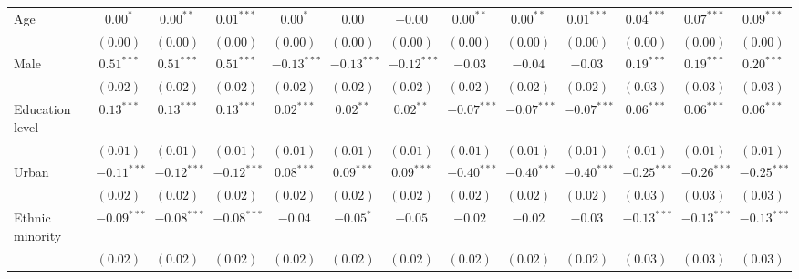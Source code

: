 \begin{table}
\begin{center}
\begin{threeparttable}
\begin{tabular}{l c c c c c c c c c c c c}
Age                             & $0.00^{*}$    & $0.00^{**}$   & $0.01^{***}$  & $0.00^{*}$    & $0.00$        & $-0.00$       & $0.00^{**}$   & $0.00^{**}$   & $0.01^{***}$  & $0.04^{***}$  & $0.07^{***}$  & $0.09^{***}$  \\
                                & $(0.00)$      & $(0.00)$      & $(0.00)$      & $(0.00)$      & $(0.00)$      & $(0.00)$      & $(0.00)$      & $(0.00)$      & $(0.00)$      & $(0.00)$      & $(0.00)$      & $(0.00)$      \\
Male                            & $0.51^{***}$  & $0.51^{***}$  & $0.51^{***}$  & $-0.13^{***}$ & $-0.13^{***}$ & $-0.12^{***}$ & $-0.03$       & $-0.04$       & $-0.03$       & $0.19^{***}$  & $0.19^{***}$  & $0.20^{***}$  \\
                                & $(0.02)$      & $(0.02)$      & $(0.02)$      & $(0.02)$      & $(0.02)$      & $(0.02)$      & $(0.02)$      & $(0.02)$      & $(0.02)$      & $(0.03)$      & $(0.03)$      & $(0.03)$      \\
Education level                 & $0.13^{***}$  & $0.13^{***}$  & $0.13^{***}$  & $0.02^{***}$  & $0.02^{**}$   & $0.02^{**}$   & $-0.07^{***}$ & $-0.07^{***}$ & $-0.07^{***}$ & $0.06^{***}$  & $0.06^{***}$  & $0.06^{***}$  \\
                                & $(0.01)$      & $(0.01)$      & $(0.01)$      & $(0.01)$      & $(0.01)$      & $(0.01)$      & $(0.01)$      & $(0.01)$      & $(0.01)$      & $(0.01)$      & $(0.01)$      & $(0.01)$      \\
Urban                           & $-0.11^{***}$ & $-0.12^{***}$ & $-0.12^{***}$ & $0.08^{***}$  & $0.09^{***}$  & $0.09^{***}$  & $-0.40^{***}$ & $-0.40^{***}$ & $-0.40^{***}$ & $-0.25^{***}$ & $-0.26^{***}$ & $-0.25^{***}$ \\
                                & $(0.02)$      & $(0.02)$      & $(0.02)$      & $(0.02)$      & $(0.02)$      & $(0.02)$      & $(0.02)$      & $(0.02)$      & $(0.02)$      & $(0.03)$      & $(0.03)$      & $(0.03)$      \\
Ethnic minority                 & $-0.09^{***}$ & $-0.08^{***}$ & $-0.08^{***}$ & $-0.04$       & $-0.05^{*}$   & $-0.05$       & $-0.02$       & $-0.02$       & $-0.03$       & $-0.13^{***}$ & $-0.13^{***}$ & $-0.13^{***}$ \\
                                & $(0.02)$      & $(0.02)$      & $(0.02)$      & $(0.02)$      & $(0.02)$      & $(0.02)$      & $(0.02)$      & $(0.02)$      & $(0.02)$      & $(0.03)$      & $(0.03)$      & $(0.03)$      \\

\end{tabular}
\end{threeparttable}
\end{center}
\end{table}
